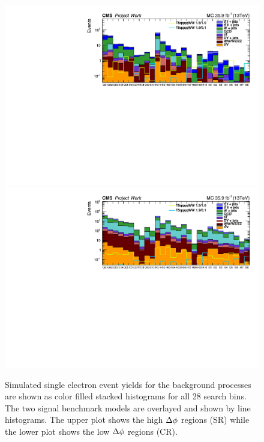  \begin{figure}[!hbt]
    \begin{center}
 \includegraphics[width=0.95 \textwidth]{Plots/analysis/signalRegions/MC__ele__SR}\\
   \includegraphics[width=0.95 \textwidth]{Plots/analysis/signalRegions/MC__ele__CR}
  \caption{ \label{fig:MCcounts_ele} Simulated single electron event yields for the background processes are shown as color filled stacked histograms for all 28 search bins. The two signal benchmark models are overlayed and shown by line histograms. The upper plot shows the high $\Delta \phi$ regions (SR) while the lower plot shows the low $\Delta \phi$ regions (CR).
  }
   \end{center}
\end{figure}

